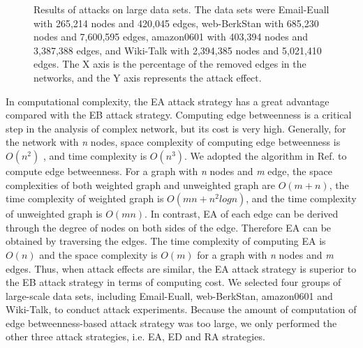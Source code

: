 \documentclass[aps,prl,twocolumn,showpacs,superscriptaddress,groupedaddress]{revtex4}  %
\begin{document}

\begin{figure}[htbp]
\begin{center}
\caption{Results of attacks on large data sets. The data sets were Email-Euall\cite{Leskovec2007Graph} with 265,214 nodes and 420,045 edges, web-BerkStan\cite{Jure2009Community} with 685,230 nodes and 7,600,595 edges, amazon0601\cite{Leskovec2007The} with  403,394 nodes and 3,387,388 edges, and Wiki-Talk\cite{Leskovec2010Predicting} with 2,394,385 nodes and 5,021,410 edges. The X axis is the percentage of the removed edges in the networks, and the Y axis represents the attack effect.} \label{fig:7}
\end{center}
\end{figure}

In computational complexity, the EA attack strategy has a great advantage compared with the EB attack strategy. Computing edge betweenness is a critical step in the analysis of complex network, but its cost is very high. Generally, for the network with \emph{n} nodes, space complexity of computing edge betweenness is $O(n^{2})$ , and time complexity is $O(n^{3})$. We adopted the algorithm in Ref. \cite{Ulrik2001A} to compute edge betweenness. For a graph with \emph{n} nodes and \emph{m} edge, the space complexities of both weighted graph and unweighted graph are $O(m+n)$, the time complexity of weighted graph is $O(mn+n^{2}logn)$, and the time complexity of unweighted graph is $O(mn)$. In contrast, EA of each edge can be derived through the degree of nodes on both sides of the edge. Therefore EA can be obtained by traversing the edges. The time complexity of computing EA is $O(n)$ and the space complexity is $O(m)$ for a graph with \emph{n} nodes and \emph{m} edges. Thus, when attack effects are similar, the EA attack strategy is superior to the EB attack strategy in terms of computing cost. We selected four groups of large-scale data sets, including Email-Euall\cite{Leskovec2007Graph}, web-BerkStan\cite{Jure2009Community}, amazon0601\cite{Leskovec2007The} and Wiki-Talk\cite{Leskovec2010Predicting}, to conduct attack experiments. Because the amount of computation of edge betweenness-based attack strategy was too large, we only performed the other three attack strategies, i.e. EA, ED and RA strategies.
\end{document}
